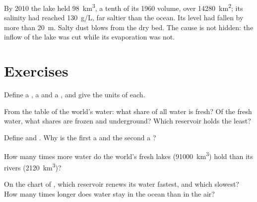 By 2010 the lake held \qty{98}{km^3}, a tenth of its 1960 volume, over
\qty{14280}{km^2}; its salinity had reached \qty{130}{g/L}, far saltier than
the ocean. Its level had fallen by more than \qty{20}{m}. Salty dust blows
from the dry bed. The cause is not hidden: the inflow of the lake was cut
while its evaporation was not.

\section{Exercises}

\begin{exercise}[$\star$]\label{exo:g10:freshwater-resources:1}
Define a , a  and a , and give the units of each.
\end{exercise}

\begin{exercise}[$\star$]\label{exo:g10:freshwater-resources:2}
From the table of the world's water: what share of all water is fresh? Of the
fresh water, what shares are frozen and underground? Which reservoir holds
the least?
\end{exercise}

\begin{exercise}[$\star$]\label{exo:g10:freshwater-resources:3}
Define  and . Why is the first a 
and the second a ?
\end{exercise}

\begin{exercise}[$\star$]\label{exo:g10:freshwater-resources:4}
How many times more water do the world's fresh lakes (\num{91000}~\unit{km^3})
hold than its rivers (\num{2120}~\unit{km^3})?
\end{exercise}

\begin{exercise}[$\star$]\label{exo:g10:freshwater-resources:5}
On the chart of , which reservoir renews its water fastest,
and which slowest? How many times longer does water stay in the ocean than in
the air?
\end{exercise}

